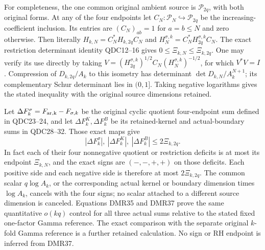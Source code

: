 For completeness, the one common original ambient source is
$\mathcal P_{2q}$, with both original forms. At any of the
four endpoints let
$C_N:\mathcal P_N\hookrightarrow\mathcal P_{2q}$
be the increasing-coefficient inclusion. Its entries are
$(C_N)_{ab}=1$ for $a=b\leq N$ and zero otherwise.
Then literally
$H_{k,N}=C_N^*H_{k,2q}C_N$ and
$H_N^{\sigma,k}=C_N^*H_{2q}^{\sigma,k}C_N$.
The exact restriction determinant identity QDC12--16 gives
$0\leq\Xi_{k,N}\leq\Xi_{k,2q}$.
One may verify its use directly by taking
$V=(H_{2q}^{\sigma,k})^{1/2}C_N
       (H_N^{\sigma,k})^{-1/2}$, for which $V^*V=I$.
Compression of $D_{k,2q}/A_k$ to this isometry has determinant
$\det D_{k,N}/A_k^{N+1}$; its complementary Schur determinant
lies in $(0,1]$. Taking negative logarithms gives the stated
inequality with the original source dimensions retained.

Let $\Delta F^\sigma_k=F_{\rm ar,k}-F_{\sigma,k}$ be the
original cyclic quotient four-endpoint sum defined in QDC23--24,
and let $\Delta F^K_k,\Delta F^B_k$ be its retained-kernel
and actual-boundary sums in QDC28--32. Those exact maps give
\[
 \boxed{\quad
 |\Delta F^\sigma_k|,\ |\Delta F^K_k|,\ |\Delta F^B_k|
      \leq2\Xi_{k,2q}.
 \quad}\tag{DMR37}
\]
In fact each of their four nonnegative quotient or restriction
deficits is at most its endpoint $\Xi_{k,N}$, and the exact
signs are $(-,-,+,+)$ on those deficits. Each positive side
and each negative side is therefore at most $2\Xi_{k,2q}$.
The common scalar $q\log A_k$, or the corresponding actual
kernel or boundary dimension times $\log A_k$, cancels with
the four signs; no scalar attached to a different source
dimension is canceled. Equations DMR35 and DMR37 prove the
same quantitative $o(kq)$ control for all three actual sums
relative to the stated fixed one-factor Gamma reference.
The exact comparison with the separate original $k$-fold
Gamma reference is a further retained calculation. No sign
or RH endpoint is inferred from DMR37.
